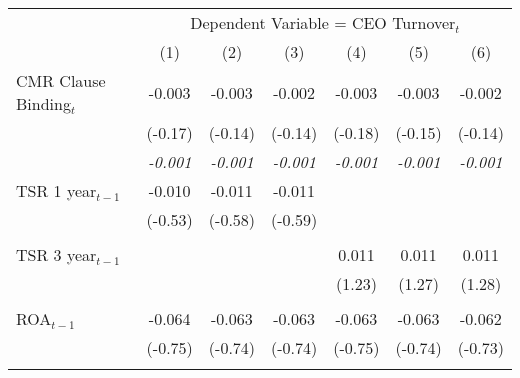{
\def\sym#1{\ifmmode^{#1}\else\(^{#1}\)\fi}
\begin{tabular}{l*{6}{c}}
\toprule &\multicolumn{6}{c}{Dependent Variable = CEO Turnover$ _t $ } \\
                &\multicolumn{1}{c}{(1)}         &\multicolumn{1}{c}{(2)}         &\multicolumn{1}{c}{(3)}         &\multicolumn{1}{c}{(4)}         &\multicolumn{1}{c}{(5)}         &\multicolumn{1}{c}{(6)}         \\
\midrule
CMR Clause Binding$ _{t} $&   -0.003         &   -0.003         &   -0.002         &   -0.003         &   -0.003         &   -0.002         \\
                &  (-0.17)         &  (-0.14)         &  (-0.14)         &  (-0.18)         &  (-0.15)         &  (-0.14)         \\
                &\textit{-0.001}         &\textit{-0.001}         &\textit{-0.001}         &\textit{-0.001}         &\textit{-0.001}         &\textit{-0.001}         \\
TSR 1 year$ _{t-1} $&   -0.010         &   -0.011         &   -0.011         &                  &                  &                  \\
                &  (-0.53)         &  (-0.58)         &  (-0.59)         &                  &                  &                  \\
                &                  &                  &                  &                  &                  &                  \\
TSR 3 year$ _{t-1} $&                  &                  &                  &    0.011         &    0.011         &    0.011         \\
                &                  &                  &                  &   (1.23)         &   (1.27)         &   (1.28)         \\
                &                  &                  &                  &                  &                  &                  \\
ROA$ _{t-1} $   &   -0.064         &   -0.063         &   -0.063         &   -0.063         &   -0.063         &   -0.062         \\
                &  (-0.75)         &  (-0.74)         &  (-0.74)         &  (-0.75)         &  (-0.74)         &  (-0.73)         \\
                &                  &                  &                  &                  &                  &                  \\

\end{tabular}}
